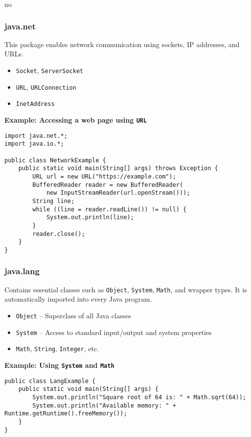 no\documentclass{article}
\newcommand{\codecmd}[1]{\textcolor[rgb]{0,0.5,0}{\texttt{#1}}}
\begin{document}
\subsubsection*{java.net}

This package enables network communication using sockets, IP addresses, and URLs.

\begin{itemize}
    \item \codecmd{Socket}, \codecmd{ServerSocket}
    \item \codecmd{URL}, \codecmd{URLConnection}
    \item \codecmd{InetAddress}
\end{itemize}

\noindent\textbf{Example: Accessing a web page using \texttt{URL}}
\begin{verbatim}
import java.net.*;
import java.io.*;

public class NetworkExample {
    public static void main(String[] args) throws Exception {
        URL url = new URL("https://example.com");
        BufferedReader reader = new BufferedReader(
            new InputStreamReader(url.openStream()));
        String line;
        while ((line = reader.readLine()) != null) {
            System.out.println(line);
        }
        reader.close();
    }
}
\end{verbatim}

\subsubsection*{java.lang}

Contains essential classes such as \codecmd{Object}, \codecmd{System}, \codecmd{Math}, and wrapper types. It is automatically imported into every Java program.

\begin{itemize}
    \item \codecmd{Object} – Superclass of all Java classes
    \item \codecmd{System} – Access to standard input/output and system properties
    \item \codecmd{Math}, \codecmd{String}, \codecmd{Integer}, etc.
\end{itemize}

\noindent\textbf{Example: Using \texttt{System} and \texttt{Math}}
\begin{verbatim}
public class LangExample {
    public static void main(String[] args) {
        System.out.println("Square root of 64 is: " + Math.sqrt(64));
        System.out.println("Available memory: " + Runtime.getRuntime().freeMemory());
    }
}
\end{verbatim}
\end{document}
